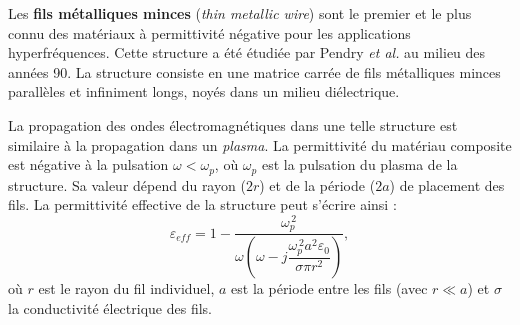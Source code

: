 Les \textbf{fils métalliques minces} (\textit{thin metallic wire}) sont le
premier et le plus connu des matériaux à permittivité négative pour les
applications hyperfréquences. Cette structure a été étudiée par Pendry
\textit{et al.} au milieu des années 90. La structure consiste en une matrice
carrée de fils métalliques minces parallèles et infiniment longs, noyés dans un
milieu diélectrique.

\begin{prop}
  La propagation des ondes électromagnétiques dans une telle structure est
  similaire à la propagation dans un \emph{plasma}. La permittivité du matériau
  composite est négative à la pulsation $\omega < \omega_p$, où $\omega_p$ est
  la pulsation du plasma de la structure. Sa valeur dépend du rayon ($2r$) et de
  la période ($2a$) de placement des fils. La permittivité effective de la
  structure peut s'écrire ainsi :
  \[
    \varepsilon_{\mathit{eff}} = 1 -
      \frac{\omega_p^{\,2}}
           {\omega\left(\omega - j\dfrac{\omega_p^{\,2}a^2\varepsilon_0}{\sigma\pi r^2}\right)},
  \]
  où $r$ est le rayon du fil individuel, $a$ est la période entre les fils
  (avec $r \ll a$) et $\sigma$ la conductivité électrique des fils.
\end{prop}


